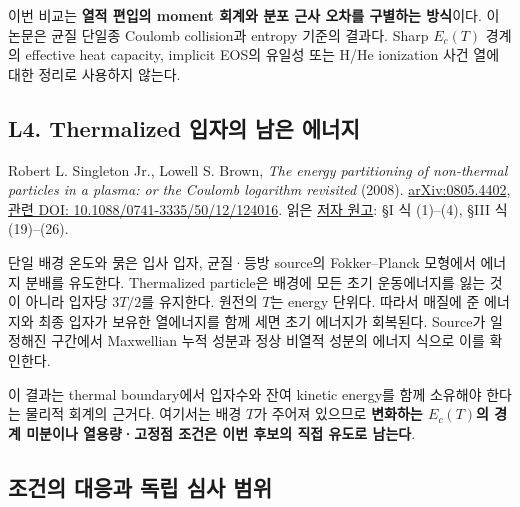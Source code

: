 \documentclass[11pt,a4paper]{article}
\begin{document}
이번 비교는 \textbf{열적 편입의 moment 회계와 분포 근사 오차를 구별하는 방식}이다. 이 논문은 균질 단일종 Coulomb collision과 entropy 기준의 결과다. Sharp \(E_c(T)\) 경계의 effective heat capacity, implicit EOS의 유일성 또는 H/He ionization 사건 열에 대한 정리로 사용하지 않는다.

\hypertarget{l4.-thermalized-uxc785uxc790uxc758-uxb0a8uxc740-uxc5d0uxb108uxc9c0}{%
\subsection{L4. Thermalized 입자의 남은 에너지}\label{l4.-thermalized-uxc785uxc790uxc758-uxb0a8uxc740-uxc5d0uxb108uxc9c0}}

Robert L. Singleton Jr., Lowell S. Brown, \emph{The energy partitioning of non-thermal particles in a plasma: or the Coulomb logarithm revisited} (2008). \href{https://arxiv.org/abs/0805.4402}{arXiv:0805.4402}, \href{https://doi.org/10.1088/0741-3335/50/12/124016}{관련 DOI: 10.1088/0741-3335/50/12/124016}. 읽은 \href{https://ar5iv.labs.arxiv.org/html/0805.4402}{저자 원고}: §I 식 (1)--(4), §III 식 (19)--(26).

단일 배경 온도와 묽은 입사 입자, 균질·등방 source의 Fokker--Planck 모형에서 에너지 분배를 유도한다. Thermalized particle은 배경에 모든 초기 운동에너지를 잃는 것이 아니라 입자당 \(3T/2\)를 유지한다. 원전의 \(T\)는 energy 단위다. 따라서 매질에 준 에너지와 최종 입자가 보유한 열에너지를 함께 세면 초기 에너지가 회복된다. Source가 일정해진 구간에서 Maxwellian 누적 성분과 정상 비열적 성분의 에너지 식으로 이를 확인한다.

이 결과는 thermal boundary에서 입자수와 잔여 kinetic energy를 함께 소유해야 한다는 물리적 회계의 근거다. 여기서는 배경 \(T\)가 주어져 있으므로 \textbf{변화하는 \(E_c(T)\)의 경계 미분이나 열용량·고정점 조건은 이번 후보의 직접 유도로 남는다}.

\hypertarget{uxc870uxac74uxc758-uxb300uxc751uxacfc-uxb3c5uxb9bd-uxc2ecuxc0ac-uxbc94uxc704}{%
\subsection{조건의 대응과 독립 심사 범위}\label{uxc870uxac74uxc758-uxb300uxc751uxacfc-uxb3c5uxb9bd-uxc2ecuxc0ac-uxbc94uxc704}}
\end{document}
